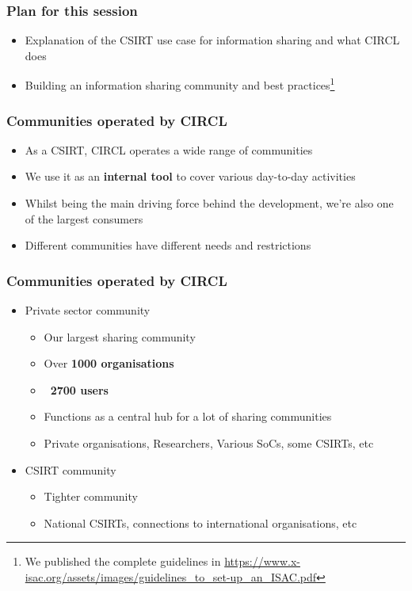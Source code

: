 
\begin{frame}[t,plain]
\titlepage
\end{frame}

\begin{frame}
	\frametitle{Plan for this session}
	\begin{itemize}
		\item Explanation of the CSIRT use case for information sharing and what CIRCL does
        \item Building an information sharing community and best practices\footnote{We published the complete guidelines in \url{https://www.x-isac.org/assets/images/guidelines_to_set-up_an_ISAC.pdf}}
	\end{itemize}
\end{frame}

\begin{frame}
\frametitle{Communities operated by CIRCL}
\begin{itemize}
        \item As a CSIRT, CIRCL operates a wide range of communities
        \item We use it as an {\bf internal tool} to cover various day-to-day activities
        \item Whilst being the main driving force behind the development, we're also one of the largest consumers
	\item Different communities have different needs and restrictions
\end{itemize}
\end{frame}

\begin{frame}
\frametitle{Communities operated by CIRCL}
\begin{itemize}
        \item Private sector community
	\begin{itemize}
		\item Our largest sharing community
		\item Over {\bf 1000 organisations}
		\item {\bf ~2700 users}
		\item Functions as a central hub for a lot of sharing communities
		\item Private organisations, Researchers, Various SoCs, some CSIRTs, etc
	\end{itemize}
	\item CSIRT community
	\begin{itemize}
		\item Tighter community
		\item National CSIRTs, connections to international organisations, etc
	\end{itemize}
\end{itemize}
\end{frame}

